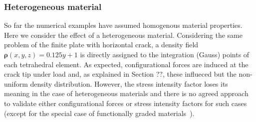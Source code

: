\documentclass[review]{elsarticle}
\numberwithin{equation}{section}
\begin{document}
\subsubsection{Heterogeneous material}
So far the numerical examples have assumed homogenous material properties. Here we consider the effect of a heterogeneous material. 
Considering the same problem of the finite plate with horizontal crack, a density field $\mathbf{\rho}(x,y,z) = 0.125y + 1$ is directly assigned to the integration (Gauss) points of each tetrahedral element.
As expected, configurational forces are induced at the crack tip under load and, as explained in Section ??, these influeced but the non-uniform density distribution. 
However, the stress intensity factor loses its meaning in the case of heterogeneous materials and there is no agreed approach to validate either configurational forces or stress intensity factors for such cases (except for the special case of functionally graded materials~\citep{kim2002finite}).
\end{document}
